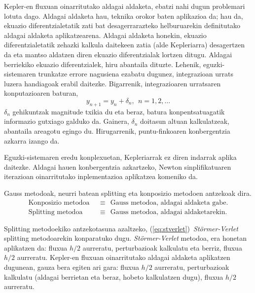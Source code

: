 Kepler-en fluxuan oinarritutako aldagai aldaketa, ebatzi nahi dugun problemari lotuta dago. Aldagai aldaketa hau, teknika orokor baten aplikazioa da; hau da, ekuazio diferentzialetatik zati bat desagerrarazteko helburuarekin definitutako aldagai aldaketa aplikatzearena. Aldagai aldaketa honekin, ekuazio diferentzialetatik zehazki kalkula daitekeen zatia (alde Kepleriarra)  desagertzen da eta mantso aldatzen diren ekuazio diferentzialak lortzen ditugu.  Aldagai berriekiko ekuazio diferentzialek, hiru abantaila dituzte. Lehenik, eguzki-sistemaren trunkatze errore nagusiena ezabatu dugunez, integrazioan urrats luzera handiagoak erabil daitezke. Bigarrenik, integrazioaren urratsaren konputazioaren baturan,
\begin{equation*}
 y_{n+1}=y_{n}+\delta_n, \ \ n=1,2,\dots
\end{equation*}
$\delta_n$ gehikuntzak magnitude txikia du eta beraz, batura konpentsatuagatik informazio gutxiago galduko da. Gainera, $\delta_n$ doitasun altuan kalkulatzeak, abantaila areagotu egingo du. Hirugarrenik, puntu-finkoaren konbergentzia azkarra izango da.

Eguzki-sistemaren eredu konplexuetan, Kepleriarrak ez diren indarrak aplika daitezke. Aldagai hauen konbergentzia azkartzeko, Newton sinplifikatuaren iterazioan oinarritutako inplementazioa aplikatzea komeniko da.                  

Gauss metodoak, neurri batean  splitting eta konposizio metodoen antzekoak dira. 
\begin{align*}
\text{Konposizio metodoa} \ \ &\equiv \ \ \text{Gauss metodoa, aldagai aldaketa gabe}.\\
\text{Splitting metodoa}  \ \ &\equiv \ \  \text{Gauss metodoa, aldagai aldaketarekin}.
\end{align*}

Splitting metodoekiko antzekotasuna azaltzeko, (\ref{eq:stverlet})~\emph{Störmer-Verlet} splitting metodoarekin konparatuko dugu. \emph{Störmer-Verlet} metodoa, era honetan aplikatzen da:  fluxua $h/2$ aurreratu, perturbazioak kalkulatu eta berriz,  fluxua $h/2$ aurreratu. Kepler-en fluxuan oinarritutako aldagai aldaketa aplikatzen dugunean, gauza bera egiten ari gara:  fluxua $h/2$ aurreratu, perturbazioak kalkulatu (aldagai berrietan eta beraz, hobeto kalkulatzen dugu),  fluxua $h/2$ aurreratu.


